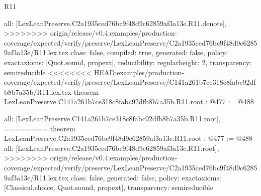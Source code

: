 \begin{lexlean}{R11}
\begin{coremodule}
{{{{{  all: [LexLeanPreserve.C2a1935ced76bc9f48d9c62859af3a13e.R11.denote],
>>>>>>>> origin/release/v0.4:examples/production-coverage/expected/verify/preserve/LexLeanPreserve/C2a1935ced76bc9f48d9c62859af3a13e/R11.lex.tex
  class: false,
  compiled: true,
  generated: false,
  policy: exact{axioms: [Quot.sound, propext]},
  reducibility: regular{height: 2},
  transparency: semireducible
}
<<<<<<<< HEAD:examples/production-coverage/expected/verify/preserve/LexLeanPreserve/C141a261b7ce318c8fabc92dfb8b7a35b/R11.lex.tex
theorem LexLeanPreserve.C141a261b7ce318c8fabc92dfb8b7a35b.R11.root : @477 := @488 {
  all: [LexLeanPreserve.C141a261b7ce318c8fabc92dfb8b7a35b.R11.root],
========
theorem LexLeanPreserve.C2a1935ced76bc9f48d9c62859af3a13e.R11.root : @477 := @488 {
  all: [LexLeanPreserve.C2a1935ced76bc9f48d9c62859af3a13e.R11.root],
>>>>>>>> origin/release/v0.4:examples/production-coverage/expected/verify/preserve/LexLeanPreserve/C2a1935ced76bc9f48d9c62859af3a13e/R11.lex.tex
  class: false,
  generated: false,
  policy: exact{axioms: [Classical.choice, Quot.sound, propext]},
  transparency: semireducible
}

}}}}}
\end{coremodule}
\end{lexlean}
